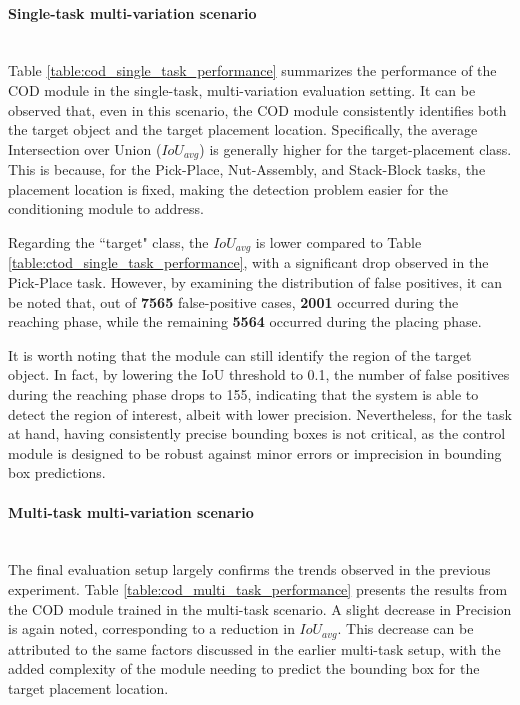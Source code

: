 
\paragraph*{Single-task multi-variation scenario}\mbox{}\\
Table \ref{table:cod_single_task_performance} summarizes the performance of the COD module in the single-task, multi-variation evaluation setting. It can be observed that, even in this scenario, the COD module consistently identifies both the target object and the target placement location. Specifically, the average Intersection over Union ($IoU_{avg}$) is generally higher for the target-placement class. This is because, for the Pick-Place, Nut-Assembly, and Stack-Block tasks, the placement location is fixed, making the detection problem easier for the conditioning module to address. 

Regarding the ``target" class, the $IoU_{avg}$ is lower compared to Table \ref{table:ctod_single_task_performance}, with a significant drop observed in the Pick-Place task. However, by examining the distribution of false positives, it can be noted that, out of \textbf{7565} false-positive cases, \textbf{2001} occurred during the reaching phase, while the remaining \textbf{5564} occurred during the placing phase. 

It is worth noting that the module can still identify the region of the target object. In fact, by lowering the IoU threshold to 0.1, the number of false positives during the reaching phase drops to 155, indicating that the system is able to detect the region of interest, albeit with lower precision. Nevertheless, for the task at hand, having consistently precise bounding boxes is not critical, as the control module is designed to be robust against minor errors or imprecision in bounding box predictions.


\paragraph*{Multi-task multi-variation scenario}\mbox{}\\
The final evaluation setup largely confirms the trends observed in the previous experiment. Table \ref{table:cod_multi_task_performance} presents the results from the COD module trained in the multi-task scenario. A slight decrease in Precision is again noted, corresponding to a reduction in $IoU_{avg}$. This decrease can be attributed to the same factors discussed in the earlier multi-task setup, with the added complexity of the module needing to predict the bounding box for the target placement location.

